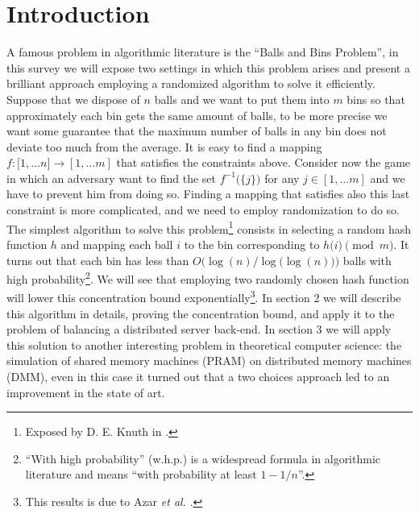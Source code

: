\section{Introduction}

A famous problem in algorithmic literature is the ``Balls and Bins Problem'',
in this survey we will expose two settings in which this problem arises
and present a brilliant approach employing a randomized algorithm to
solve it efficiently.
Suppose that we dispose of $n$ balls and we want to put them into $m$
bins so that approximately each bin gets the same amount of balls, to be
more precise we want some guarantee that the maximum number of balls
in any bin does not deviate too much from the average. It is easy to find
a mapping $f:\bigl[1,\dots n]\longrightarrow[1,\dots m]$ that satisfies the
constraints above. Consider now the game in which an adversary want to
find the set $f^{-1}\bigl(\{j\}\bigr)$ for any $j \in [1,\dots m]$ and we
have to prevent him from doing so. Finding a mapping that satisfies also
this last constraint is more complicated,
and we need to employ randomization to do so.
The simplest algorithm to solve this problem\footnote{Exposed by D. E. Knuth in \cite{Knuth}.} consists in selecting a random
hash function $h$ and mapping each ball $i$ to the bin corresponding to
$h\bigl(i\bigr) \pmod{m}$. It turns out that each bin has
less than $O\bigl(\log(n) / \log\bigl(\log(n)\bigr)\bigr)$ balls with high probability\footnote{``With high
  probability'' (w.h.p.) is a widespread formula in
  algorithmic literature and means ``with
  probability at least $1 - 1 / n$''.}. We will see that employing two randomly
chosen hash function will lower this concentration bound exponentially\footnote{This results is due to Azar
  {\em et al.} \cite{Azar}.}.
In section 2 we will describe this algorithm in details, proving the
concentration bound, and apply it to the problem of balancing a distributed
server back-end. In section 3 we will apply this solution to another interesting
problem in theoretical computer science: the simulation of shared memory
machines (PRAM) on distributed memory machines (DMM), even in this case it
turned out that a two choices approach led to an improvement in the state of
art. 

